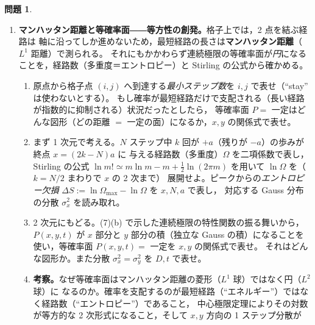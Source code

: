 \documentclass[dvipdfmx, uplatex]{jsarticle}
\newcommand{\bk}{\bm{k}}
\theoremstyle{definition}
\newtheorem{prob}{問題}
\begin{document}
\begin{prob}
\begin{enumerate}
\begin{enumerate}
\item master 方程式を $P_{n+1}(i,j)-P_n(i,j)$ の形に書き，$a,\tau$ が小さいとして
$P(x,y,t)$ の Taylor 展開で両辺を評価せよ。(6) の diffusive scaling のもとで $a,\tau\to0$ とし，
$P(x,y,t)$ が満たす偏微分方程式を導け。
\item (3) の $\hat P_n(\bk)$ の diffusive 極限 $\displaystyle\lim\hat P_n(\bk)$ を $D,t,\bk$ で求めよ
（$\lambda(\bk)$ の小 $\bk$ 展開を使う）。これを逆 Fourier 変換して，連続極限の確率密度 $P(x,y,t)$ を求めよ。
\item 得た $P(x,y,t)$ が (a) の偏微分方程式を満たすことを確かめよ。さらに連続極限の平均二乗変位
$\langle x^2+y^2\rangle$ を $D,t$ で求め，(4)(6) の結果と整合することを確かめよ。
\end{enumerate}
\item \textbf{マンハッタン距離と等確率面――等方性の創発。}格子上では，2 点を結ぶ経路は
軸に沿ってしか進めないため，最短経路の長さは\textbf{マンハッタン距離}（$L^1$ 距離）で測られる。
それにもかかわらず連続極限の等確率面が\emph{円}になることを，経路数（多重度＝エントロピー）と
Stirling の公式から確かめる。
\begin{enumerate}
\item 原点から格子点 $(i,j)$ へ到達する\emph{最小ステップ数}を $i,j$ で表せ（``stay'' は使わないとする）。
もし確率が最短経路だけで支配される（長い経路が指数的に抑制される）状況だったとしたら，
等確率面 $P=$ 一定はどんな図形（どの距離 $=$ 一定の面）になるか，$x,y$ の関係式で表せ。
\item まず 1 次元で考える。$N$ ステップ中 $k$ 回が $+a$（残りが $-a$）の歩みが終点 $x=(2k-N)a$ に
与える経路数（多重度）$\Omega$ を二項係数で表し，Stirling の公式
$\ln m!\simeq m\ln m-m+\tfrac12\ln(2\pi m)$ を用いて $\ln\Omega$ を（$k=N/2$ まわりで $x$ の 2 次まで）
展開せよ。ピークからの\emph{エントロピー欠損} $\Delta S:=\ln\Omega_{\max}-\ln\Omega$ を $x,N,a$ で表し，
対応する Gauss 分布の分散 $\sigma_x^2$ を読み取れ。
\item 2 次元にもどる。(7)(b) で示した連続極限の特性関数の振る舞いから，$P(x,y,t)$ が $x$ 部分と
$y$ 部分の積（独立な Gauss の積）になることを使い，等確率面 $P(x,y,t)=$ 一定を $x,y$ の関係式で表せ。
それはどんな図形か。また分散 $\sigma_x^2=\sigma_y^2$ を $D,t$ で表せ。
\item \textbf{考察。}なぜ等確率面はマンハッタン距離の菱形（$L^1$ 球）ではなく円（$L^2$ 球）に
なるのか。確率を支配するのが最短経路（``エネルギー''）ではなく経路数（``エントロピー''）であること，
中心極限定理によりその対数が等方的な 2 次形式になること，そして $x,y$ 方向の 1 ステップ分散が

\end{enumerate}
\end{enumerate}
\end{prob}
\end{document}
